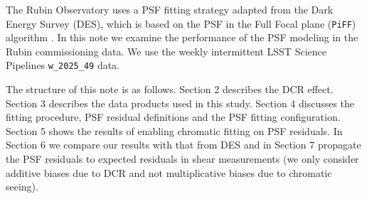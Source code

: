 The Rubin Observatory uses a PSF fitting strategy adapted from the Dark Energy Survey (DES), which is based on the PSF in the Full Focal plane (\texttt{PiFF}) algorithm \citep{jarvis2021}. 
In this note we examine the performance of the PSF modeling in the Rubin commissioning data. 
We use the weekly intermittent LSST Science Pipelines \citep{PSTN-019} \texttt{w\_2025\_49} data.

The structure of this note is as follows. Section 2 describes the DCR effect. 
Section 3 describes the data products used in this study. 
Section 4 discusses the fitting procedure, PSF residual definitions and the PSF fitting configuration.
Section 5 shows the results of enabling chromatic fitting on PSF residuals. 
In Section 6 we compare our results with that from DES and in Section 7 propagate the PSF residuals to expected residuals in shear measurements (we only consider additive biases due to DCR and not multiplicative biases due to chromatic seeing).

